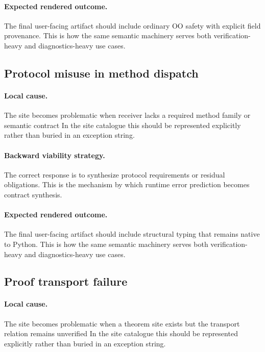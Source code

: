 \documentclass[11pt]{report}
\theoremstyle{definition}
\theoremstyle{plain}
\begin{document}
\paragraph{Expected rendered outcome.}
The final user-facing artifact should include ordinary OO safety with explicit field provenance. This is how the same
semantic machinery serves both verification-heavy and diagnostics-heavy use
cases.

\subsection{Protocol misuse in method dispatch}

\paragraph{Local cause.}
The site becomes problematic when receiver lacks a required method family or semantic contract In the site catalogue this should be
represented explicitly rather than buried in an exception string.

\paragraph{Backward viability strategy.}
The correct response is to synthesize protocol requirements or residual obligations. This is the mechanism by which runtime
error prediction becomes contract synthesis.

\paragraph{Expected rendered outcome.}
The final user-facing artifact should include structural typing that remains native to Python. This is how the same
semantic machinery serves both verification-heavy and diagnostics-heavy use
cases.

\subsection{Proof transport failure}

\paragraph{Local cause.}
The site becomes problematic when a theorem site exists but the transport relation remains unverified In the site catalogue this should be
represented explicitly rather than buried in an exception string.
\end{document}
